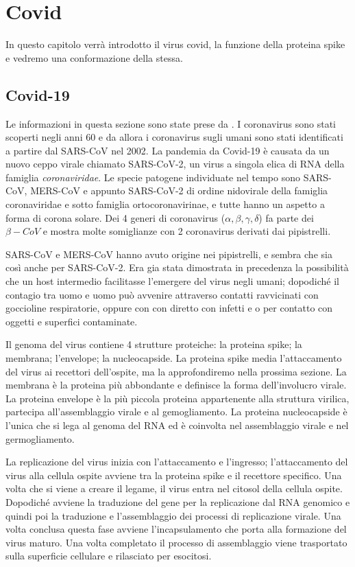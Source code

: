 \chapter{Covid}\label{chapter:Covid}
In questo capitolo verrà introdotto il virus covid, la funzione della proteina spike e vedremo una conformazione della stessa. 


\section{Covid-19}\label{sec:cap_sec_subsec}
Le informazioni in questa sezione sono state prese da \cite{ProprietàCovid}.
I coronavirus sono stati scoperti negli anni 60 e da allora i coronavirus sugli umani sono stati identificati a partire dal SARS-CoV nel 2002. La pandemia da Covid-19 
è causata da un nuovo ceppo virale chiamato SARS-CoV-2, un virus a singola elica di RNA della famiglia \emph{coronaviridae}. Le specie patogene individuate nel tempo
sono SARS-CoV, MERS-CoV e appunto SARS-CoV-2 di ordine nidovirale della famiglia coronaviridae e sotto famiglia ortocoronavirinae, e tutte hanno un aspetto a forma
di corona solare. Dei 4 generi di coronavirus ($\alpha, \beta, \gamma, \delta$) fa parte dei $\beta-CoV$ e mostra molte somiglianze con 2 coronavirus derivati dai 
pipistrelli. 

SARS-CoV e MERS-CoV hanno avuto origine nei pipistrelli, e sembra che sia così anche per SARS-CoV-2. Era gia stata dimostrata in precedenza la possibilità che un host
intermedio facilitasse l'emergere del virus negli umani; dopodiché il contagio tra uomo e uomo può avvenire attraverso contatti ravvicinati con goccioline respiratorie, 
oppure con con diretto con infetti e o per contatto con oggetti e superfici contaminate.

Il genoma del virus contiene 4 strutture proteiche: la proteina spike; la membrana; l'envelope; la nucleocapside. La proteina spike media l'attaccamento del virus ai 
recettori dell'ospite, ma la approfondiremo nella prossima sezione. La membrana è la proteina più abbondante e definisce la forma dell'involucro virale. La proteina 
envelope è la più piccola proteina appartenente alla struttura virilica, partecipa all'assemblaggio virale e al gemogliamento. La proteina nucleocapside è l'unica che 
si lega al genoma del RNA ed è coinvolta nel assemblaggio virale e nel germogliamento. 

La replicazione del virus inizia con l'attaccamento e l'ingresso; l'attaccamento del virus alla cellula ospite avviene tra la proteina spike e il recettore specifico. 
Una volta che si viene a creare il legame, il virus entra nel citosol della cellula ospite. Dopodiché avviene la traduzione del gene per la replicazione dal RNA 
genomico e quindi poi la traduzione e l'assemblaggio dei processi di replicazione virale. Una volta conclusa questa fase avviene l'incapsulamento che porta alla 
formazione del virus maturo. Una volta completato il processo di assemblaggio viene trasportato sulla superficie cellulare e rilasciato per esocitosi.

